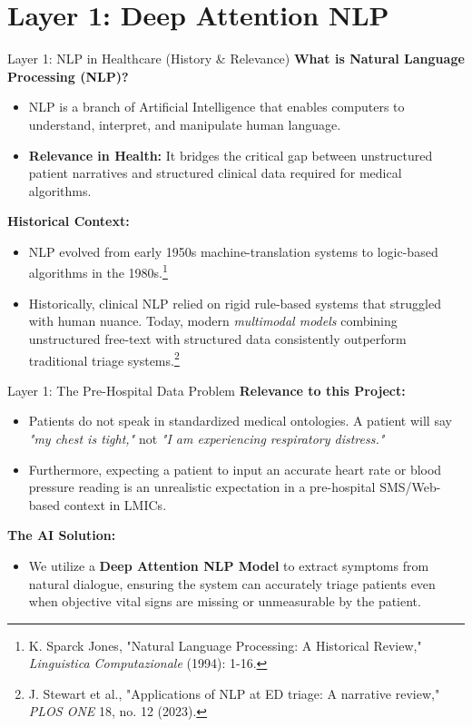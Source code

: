 \documentclass[11pt, aspectratio=169]{beamer}
\begin{document}
	\section{Layer 1: Deep Attention NLP}
	\begin{frame}{Layer 1: NLP in Healthcare (History \& Relevance)}
		\textbf{What is Natural Language Processing (NLP)?}
		\begin{itemize}
			\item NLP is a branch of Artificial Intelligence that enables computers to understand, interpret, and manipulate human language.
			\item \textbf{Relevance in Health:} It bridges the critical gap between unstructured patient narratives and structured clinical data required for medical algorithms.
		\end{itemize}
		\vspace{0.2cm}
		\textbf{Historical Context:}
		\begin{itemize}
			\item NLP evolved from early 1950s machine-translation systems to logic-based algorithms in the 1980s.\footnote{K. Sparck Jones, "Natural Language Processing: A Historical Review," \textit{Linguistica Computazionale} (1994): 1-16.}
			\item Historically, clinical NLP relied on rigid rule-based systems that struggled with human nuance. Today, modern \textit{multimodal models} combining unstructured free-text with structured data consistently outperform traditional triage systems.\footnote{J. Stewart et al., "Applications of NLP at ED triage: A narrative review," \textit{PLOS ONE} 18, no. 12 (2023).}
		\end{itemize}
	\end{frame}
	
	\begin{frame}{Layer 1: The Pre-Hospital Data Problem}
		\textbf{Relevance to this Project:}
		\begin{itemize}
			\item Patients do not speak in standardized medical ontologies. A patient will say \textit{"my chest is tight,"} not \textit{"I am experiencing respiratory distress."}
			\item Furthermore, expecting a patient to input an accurate heart rate or blood pressure reading is an unrealistic expectation in a pre-hospital SMS/Web-based context in LMICs.
		\end{itemize}
		\vspace{0.2cm}
		\textbf{The AI Solution:}
		\begin{itemize}
			\item We utilize a \textbf{Deep Attention NLP Model} to extract symptoms from natural dialogue, ensuring the system can accurately triage patients even when objective vital signs are missing or unmeasurable by the patient.
		\end{itemize}
	\end{frame}
	
\end{document}
